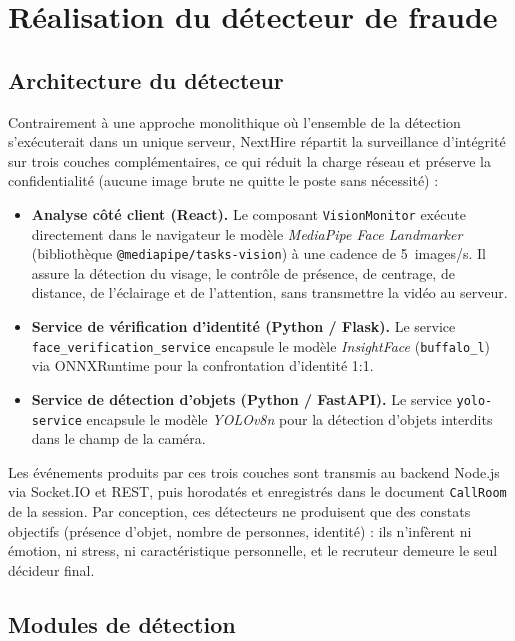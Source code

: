 \section{Réalisation du détecteur de fraude}

\subsection{Architecture du détecteur}

Contrairement à une approche monolithique où l'ensemble de la détection s'exécuterait dans
un unique serveur, NextHire répartit la surveillance d'intégrité sur trois couches
complémentaires, ce qui réduit la charge réseau et préserve la confidentialité (aucune image
brute ne quitte le poste sans nécessité) :

\begin{itemize}
  \item \textbf{Analyse côté client (React).} Le composant \texttt{VisionMonitor} exécute
        directement dans le navigateur le modèle \textit{MediaPipe Face Landmarker}
        (bibliothèque \texttt{@mediapipe/tasks-vision}) à une cadence de 5~images/s. Il assure
        la détection du visage, le contrôle de présence, de centrage, de distance, de
        l'éclairage et de l'attention, sans transmettre la vidéo au serveur.
  \item \textbf{Service de vérification d'identité (Python / Flask).} Le service
        \texttt{face\_verification\_service} encapsule le modèle \textit{InsightFace}
        (\texttt{buffalo\_l}) via ONNXRuntime pour la confrontation d'identité 1:1.
  \item \textbf{Service de détection d'objets (Python / FastAPI).} Le service
        \texttt{yolo-service} encapsule le modèle \textit{YOLOv8n} pour la détection d'objets
        interdits dans le champ de la caméra.
\end{itemize}

Les événements produits par ces trois couches sont transmis au backend Node.js via
Socket.IO et REST, puis horodatés et enregistrés dans le document \texttt{CallRoom} de la
session. Par conception, ces détecteurs ne produisent que des constats objectifs (présence
d'objet, nombre de personnes, identité) : ils n'infèrent ni émotion, ni stress, ni
caractéristique personnelle, et le recruteur demeure le seul décideur final.

\subsection{Modules de détection}


